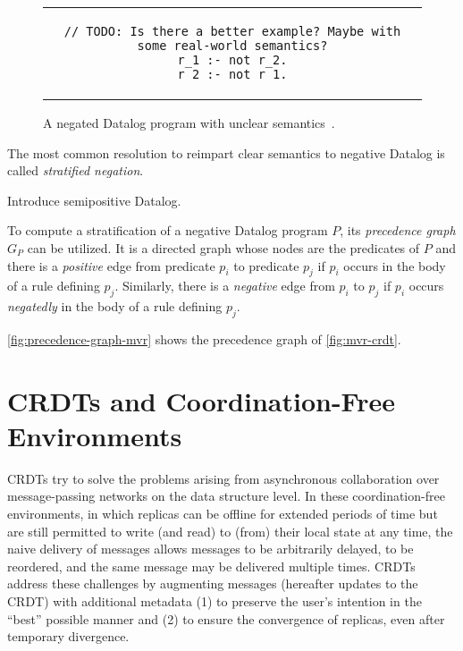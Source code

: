 \begin{figure}[htpb]
	\centering
	\begin{tabular}{c}
		\begin{lstlisting}[keepspaces]
// TODO: Is there a better example? Maybe with some real-world semantics?
r_1 :- not r_2.
r_2 :- not r_1.\end{lstlisting}
	\end{tabular}
	\caption{A negated Datalog program with unclear semantics~\cite{green2013datalog}.}\label{code:negated-datalog-issue}
\end{figure}

The most common resolution to reimpart clear semantics to negative Datalog
is called \emph{stratified negation}.

Introduce semipositive Datalog.

To compute a stratification of a negative Datalog program \(P\),
its \emph{precedence graph} \(G_P\) can be utilized.
It is a directed graph whose nodes are the predicates of \(P\) and there is
a \emph{positive} edge from predicate \(p_i\) to predicate \(p_j\)
if \(p_i\) occurs in the body of a rule defining \(p_j\).
Similarly, there is a \emph{negative} edge from \(p_i\) to \(p_j\)
if \(p_i\) occurs \emph{negatedly} in the body of a rule defining \(p_j\).

\ref{fig:precedence-graph-mvr} shows the precedence graph of \ref{fig:mvr-crdt}.

\section{\acsp{CRDT} and Coordination-Free Environments}

\acp{CRDT}\footnotemark{} try to solve the problems arising from asynchronous
collaboration over message-passing networks on the data structure level.
In these coordination-free environments, in which replicas can be offline
for extended periods of time but are still permitted to write (and read)
to (from) their local state at any time,
the naive delivery of messages allows messages to be arbitrarily delayed,
to be reordered, and the same message may be delivered multiple times.
\acp{CRDT} address these challenges by augmenting messages (hereafter updates
to the \ac{CRDT}) with additional metadata (1) to preserve the user's intention
in the ``best'' possible manner and (2) to ensure the convergence of replicas,
even after temporary divergence.


